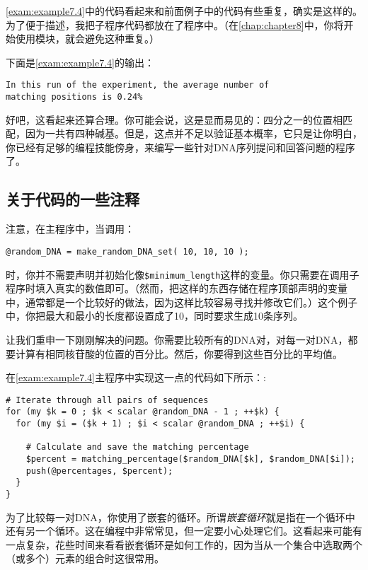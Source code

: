 \autoref{exam:example7.4}中的代码看起来和前面例子中的代码有些重复，确实是这样的。为了便于描述，我把子程序代码都放在了程序中。（在\autoref{chap:chapter8}中，你将开始使用模块，就会避免这种重复。）

下面是\autoref{exam:example7.4}的输出：

\begin{lstlisting}
In this run of the experiment, the average number of 
matching positions is 0.24%
\end{lstlisting}

好吧，这看起来还算合理。你可能会说，这是显而易见的：四分之一的位置相匹配，因为一共有四种碱基。但是，这点并不足以验证基本概率，它只是让你明白，你已经有足够的编程技能傍身，来编写一些针对DNA序列提问和回答问题的程序了。

\subsection{关于代码的一些注释}
注意，在主程序中，当调用：

\begin{lstlisting}
@random_DNA = make_random_DNA_set( 10, 10, 10 );
\end{lstlisting}

时，你并不需要声明并初始化像\verb|$minimum_length|这样的变量。你只需要在调用子程序时填入真实的数值即可。（然而，把这样的东西存储在程序顶部声明的变量中，通常都是一个比较好的做法，因为这样比较容易寻找并修改它们。）这个例子中，你把最大和最小的长度都设置成了10，同时要求生成10条序列。

让我们重申一下刚刚解决的问题。你需要比较所有的DNA对，对每一对DNA，都要计算有相同核苷酸的位置的百分比。然后，你要得到这些百分比的平均值。

在\autoref{exam:example7.4}主程序中实现这一点的代码如下所示：:

\begin{lstlisting}
# Iterate through all pairs of sequences
for (my $k = 0 ; $k < scalar @random_DNA - 1 ; ++$k) {
  for (my $i = ($k + 1) ; $i < scalar @random_DNA ; ++$i) {

    # Calculate and save the matching percentage
    $percent = matching_percentage($random_DNA[$k], $random_DNA[$i]);
    push(@percentages, $percent);
  }
}
\end{lstlisting}

为了比较每一对DNA，你使用了嵌套的循环。所谓\textit{嵌套循环}就是指在一个循环中还有另一个循环。这在编程中非常常见，但一定要小心处理它们。这看起来可能有一点复杂，花些时间来看看嵌套循环是如何工作的，因为当从一个集合中选取两个（或多个）元素的组合时这很常用。


